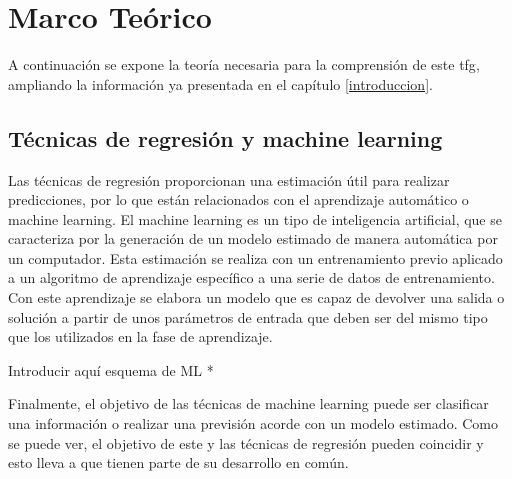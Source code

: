 
\chapter{Marco Teórico}
\label{marcoteorico}
\par A continuación se expone la teoría necesaria para la comprensión de este \gls{tfg}, ampliando la información ya presentada en el capítulo \ref{introduccion}.
\section{Técnicas de regresión y machine learning}


\par Las técnicas de regresión proporcionan una estimación útil para realizar predicciones, por lo que están relacionados con el aprendizaje automático o machine learning. El machine learning es un tipo de inteligencia artificial, que se caracteriza por la generación de un modelo estimado de manera automática por un computador. Esta estimación se realiza con un entrenamiento previo aplicado a un algoritmo de aprendizaje específico a una serie de datos de entrenamiento. Con este aprendizaje se elabora un modelo que es capaz de devolver una salida o solución a partir de unos parámetros de entrada que deben ser del mismo tipo que los utilizados en la fase de aprendizaje. 
\\
\par * Introducir aquí esquema de ML *
\\
\par Finalmente, el objetivo de las técnicas de machine learning puede ser clasificar una información o realizar una previsión acorde con un modelo estimado. Como se puede ver, el objetivo de este y las técnicas de regresión pueden coincidir y esto lleva a que tienen parte de su desarrollo en común. 

